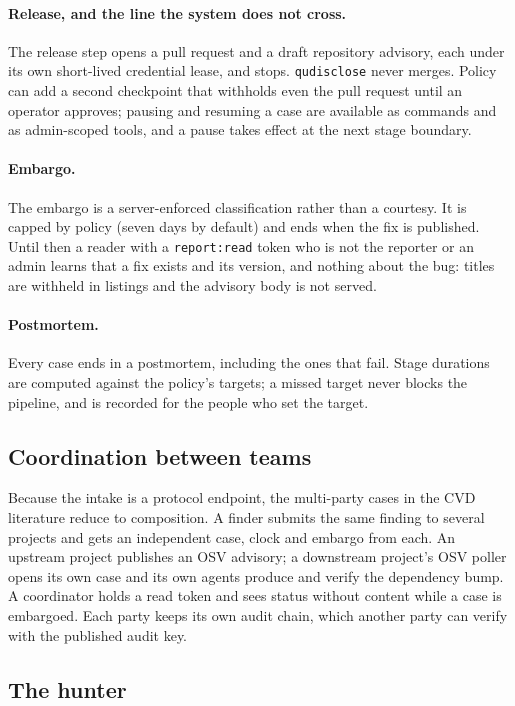\documentclass[11pt]{article}
\newcommand{\qud}{\texttt{qudisclose}}
\newcommand{\code}[1]{\texttt{\small #1}}
\begin{document}
\paragraph{Release, and the line the system does not cross.} The release step opens a pull request and a draft
repository advisory, each under its own short-lived credential lease, and stops. \qud{} never merges. Policy can
add a second checkpoint that withholds even the pull request until an operator approves; pausing and resuming a
case are available as commands and as admin-scoped tools, and a pause takes effect at the next stage boundary.

\paragraph{Embargo.} The embargo is a server-enforced classification rather than a courtesy. It is capped by
policy (seven days by default) and ends when the fix is published. Until then a reader with a
\code{report:read} token who is not the reporter or an admin learns that a fix exists and its version, and
nothing about the bug: titles are withheld in listings and the advisory body is not served.

\paragraph{Postmortem.} Every case ends in a postmortem, including the ones that fail. Stage durations are
computed against the policy's targets; a missed target never blocks the pipeline, and is recorded for the
people who set the target.

\subsection{Coordination between teams}

Because the intake is a protocol endpoint, the multi-party cases in the CVD literature reduce to composition. A
finder submits the same finding to several projects and gets an independent case, clock and embargo from each.
An upstream project publishes an OSV advisory; a downstream project's OSV poller opens its own case and its own
agents produce and verify the dependency bump. A coordinator holds a read token and sees status without content
while a case is embargoed. Each party keeps its own audit chain, which another party can verify with the
published audit key.

\subsection{The hunter}
\label{sec:hunter}
\end{document}
